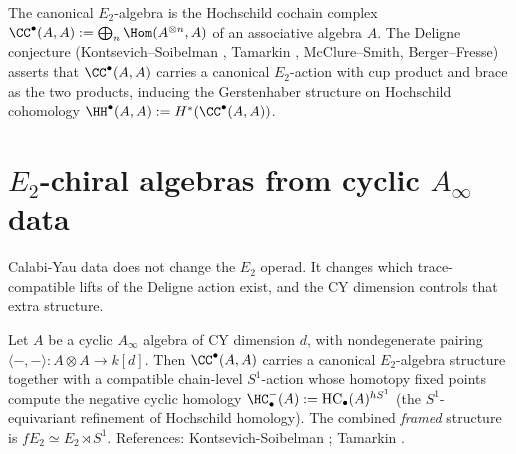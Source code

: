 \begin{remark}
\label{rem:deligne-hochschild}
The canonical $E_2$-algebra is the Hochschild cochain complex
$\CC^\bullet(A,A) := \bigoplus_n \Hom(A^{\otimes n}, A)$ of an
associative algebra $A$. The Deligne conjecture (Kontsevich--Soibelman
\cite{KontsevichSoibelmanDefI}, Tamarkin \cite{TamarkinDGCat},
McClure--Smith, Berger--Fresse) asserts that $\CC^\bullet(A,A)$ carries
a canonical $E_2$-action with cup product and brace as the two
products, inducing the Gerstenhaber structure on Hochschild cohomology
$\HH^\bullet(A,A) := H^*(\CC^\bullet(A,A))$.
\end{remark}

\section{\texorpdfstring{$E_2$}{E-2}-chiral algebras from cyclic \texorpdfstring{$A_\infty$}{A-inf} data}
\label{sec:e2-from-cyclic-ainf}

Calabi-Yau data does not change the $E_2$ operad. It changes which
trace-compatible lifts of the Deligne action exist, and the CY
dimension controls that extra structure.

\begin{theorem}
\label{thm:ks-tamarkin-cyclic-e2}
Let $A$ be a cyclic $A_\infty$ algebra of CY dimension $d$, with
nondegenerate pairing $\langle-,-\rangle\colon A \otimes A \to k[d]$.
Then $\CC^\bullet(A,A)$ carries a canonical $E_2$-algebra structure
together with a compatible chain-level $S^1$-action whose homotopy
fixed points compute the negative cyclic homology
$\HC^-_\bullet(A) := \mathrm{HC}_\bullet(A)^{hS^1}$ \textup{(}the
$S^1$-equivariant refinement of Hochschild homology\textup{).}
The combined \emph{framed} structure is $fE_2 \simeq E_2 \rtimes S^1$. References:
Kontsevich-Soibelman \cite{KontsevichSoibelmanDefI}; Tamarkin
\cite{TamarkinDGCat}.
\end{theorem}

